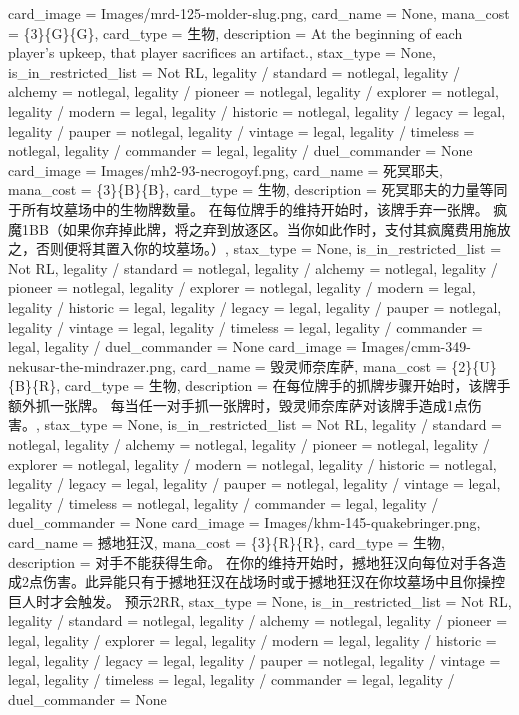 \documentclass[lang = cn, color = black, 10pt]{AllThatStax}
\begin{document}
\card
{
	card_image = Images/mrd-125-molder-slug.png,
	card_name = None,
	mana_cost = \{3\}\{G\}\{G\},
	card_type = 生物,
	description = At the beginning of each player's upkeep, that player sacrifices an artifact.,
	stax_type = None,
	is_in_restricted_list = Not RL,
	legality / standard = notlegal,
	legality / alchemy = notlegal,
	legality / pioneer = notlegal,
	legality / explorer = notlegal,
	legality / modern = legal,
	legality / historic = notlegal,
	legality / legacy = legal,
	legality / pauper = notlegal,
	legality / vintage = legal,
	legality / timeless = notlegal,
	legality / commander = legal,
	legality / duel_commander = None
}
\card
{
	card_image = Images/mh2-93-necrogoyf.png,
	card_name = 死冥耶夫,
	mana_cost = \{3\}\{B\}\{B\},
	card_type = 生物,
	description = 死冥耶夫的力量等同于所有坟墓场中的生物牌数量。
	在每位牌手的维持开始时，该牌手弃一张牌。
	疯魔{1}{B}{B}（如果你弃掉此牌，将之弃到放逐区。当你如此作时，支付其疯魔费用施放之，否则便将其置入你的坟墓场。）,
	stax_type = None,
	is_in_restricted_list = Not RL,
	legality / standard = notlegal,
	legality / alchemy = notlegal,
	legality / pioneer = notlegal,
	legality / explorer = notlegal,
	legality / modern = legal,
	legality / historic = legal,
	legality / legacy = legal,
	legality / pauper = notlegal,
	legality / vintage = legal,
	legality / timeless = legal,
	legality / commander = legal,
	legality / duel_commander = None
}
\card
{
	card_image = Images/cmm-349-nekusar-the-mindrazer.png,
	card_name = 毁灵师奈库萨,
	mana_cost = \{2\}\{U\}\{B\}\{R\},
	card_type = 生物,
	description = 在每位牌手的抓牌步骤开始时，该牌手额外抓一张牌。
	每当任一对手抓一张牌时，毁灵师奈库萨对该牌手造成1点伤害。,
	stax_type = None,
	is_in_restricted_list = Not RL,
	legality / standard = notlegal,
	legality / alchemy = notlegal,
	legality / pioneer = notlegal,
	legality / explorer = notlegal,
	legality / modern = notlegal,
	legality / historic = notlegal,
	legality / legacy = legal,
	legality / pauper = notlegal,
	legality / vintage = legal,
	legality / timeless = notlegal,
	legality / commander = legal,
	legality / duel_commander = None
}
\card
{
	card_image = Images/khm-145-quakebringer.png,
	card_name = 撼地狂汉,
	mana_cost = \{3\}\{R\}\{R\},
	card_type = 生物,
	description = 对手不能获得生命。
	在你的维持开始时，撼地狂汉向每位对手各造成2点伤害。此异能只有于撼地狂汉在战场时或于撼地狂汉在你坟墓场中且你操控巨人时才会触发。
	预示{2}{R}{R},
	stax_type = None,
	is_in_restricted_list = Not RL,
	legality / standard = notlegal,
	legality / alchemy = notlegal,
	legality / pioneer = legal,
	legality / explorer = legal,
	legality / modern = legal,
	legality / historic = legal,
	legality / legacy = legal,
	legality / pauper = notlegal,
	legality / vintage = legal,
	legality / timeless = legal,
	legality / commander = legal,
	legality / duel_commander = None
}
\end{document}

